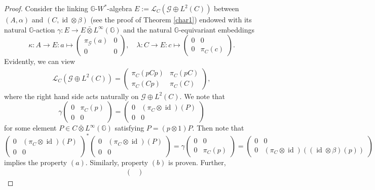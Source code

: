 \documentclass[10pt,a4paper]{amsart}
\DeclareMathOperator{\id}{\mathrm{id}}
\newcommand{\G}{\mathbb{G}}
\newcommand{\ovot}{\bar{\otimes}}
\begin{document}
\begin{proof}
Consider the linking $\G$-$W^*$-algebra $E:=\mathscr{L}_C(\mathcal{G}\oplus L^2(C))$ between $(A, \alpha)$ and $(C, \id \otimes \beta)$ (see the proof of Theorem \ref{char1}) endowed with its natural $\G$-action $\gamma: E\to E\ovot L^\infty(\G)$
and the natural $\G$-equivariant embeddings
$$\kappa: A \to E: a \mapsto \begin{pmatrix}
    \pi_\mathcal{G}(a) & 0 \\ 0 & 0
\end{pmatrix}, \quad \lambda: C \to E: c \mapsto \begin{pmatrix}
    0 & 0 \\ 0 & \pi_C(c)
\end{pmatrix}.$$
Evidently, we can view
\begin{align*}
    \mathscr{L}_C(\mathcal{G}\oplus L^2(C))= \begin{pmatrix}
        \pi_C(pCp) & \pi_C(pC) \\ \pi_C(Cp) & \pi_C(C)
    \end{pmatrix},
\end{align*}
 where the right hand side acts naturally on $\mathcal{G}\oplus L^2(C)$. We note that 
$$ \gamma\begin{pmatrix}
    0 & \pi_C(p) \\ 0 & 0
\end{pmatrix}  = \begin{pmatrix}
    0 & (\pi_C\otimes \id)(P) \\ 0 & 0
\end{pmatrix}$$
for some element $P\in C \ovot L^\infty(\G)$ satisfying $P=(p\otimes 1)P$. Then note that 
$$\begin{pmatrix}
    0 & (\pi_C\otimes \id)(P) \\ 0 & 0
\end{pmatrix}^* \begin{pmatrix}
    0 & (\pi_C\otimes \id)(P) \\ 0 & 0
\end{pmatrix} = \gamma \begin{pmatrix}
    0 & 0 \\ 0 & \pi_C(p)
\end{pmatrix}= \begin{pmatrix}
    0 & 0 \\ 0 & (\pi_C \otimes \id)((\id \otimes \beta)(p))
\end{pmatrix}$$
implies the property $(a)$. Similarly, property $(b)$ is proven. Further,
\begin{align*}
    &\begin{pmatrix}

\end{pmatrix}
\end{align*}
\end{proof}
\end{document}
